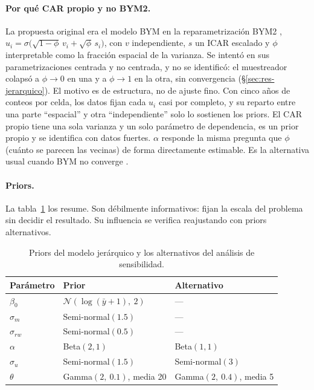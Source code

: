 \paragraph{Por qué CAR propio y no BYM2.} La propuesta original era el modelo
BYM \parencite{besag1991bayesian} en la reparametrización BYM2
\parencite{riebler2016intuitive},
$u_i = \sigma\big(\sqrt{1-\phi}\, v_i + \sqrt{\phi}\, s_i\big)$, con $v$
independiente, $s$ un ICAR escalado y $\phi$ interpretable como la fracción
espacial de la varianza. Se intentó en sus parametrizaciones centrada y no
centrada, y no se identificó: el muestreador colapsó a $\phi \to 0$ en una y a
$\phi \to 1$ en la otra, sin convergencia (§\ref{sec:res-jerarquico}). El
motivo es de estructura, no de ajuste fino. Con cinco años de conteos por
celda, los datos fijan cada $u_i$ casi por completo, y su reparto entre una
parte ``espacial'' y otra ``independiente'' solo lo sostienen los priors. El
CAR propio tiene una sola varianza y un solo parámetro de dependencia, es un
prior propio y se identifica con datos fuertes. $\alpha$ responde la misma
pregunta que $\phi$ (cuánto se parecen las vecinas) de forma directamente
estimable. Es la alternativa usual cuando BYM no converge
\parencite{banerjee2014hierarchical}.

\paragraph{Priors.} La tabla~\ref{tab:priors} los resume. Son débilmente
informativos: fijan la escala del problema sin decidir el resultado. Su
influencia se verifica reajustando con priors alternativos.

\begin{table}[t]
	\centering\footnotesize
	\caption{Priors del modelo jerárquico y los alternativos del análisis de
		sensibilidad.}
	\label{tab:priors}
	\begin{tabular}{@{}lll@{}}
		\toprule
		Parámetro     & Prior                               & Alternativo                 \\
		\midrule
		$\beta_0$     & $\mathcal{N}(\log(\bar y + 1),\ 2)$ & ---                         \\
		$\sigma_m$    & Semi-normal$(1.5)$                & ---                         \\
		$\sigma_{rw}$ & Semi-normal$(0.5)$                & ---                         \\
		$\alpha$      & Beta$(2, 1)$                        & Beta$(1, 1)$                \\
		$\sigma_u$    & Semi-normal$(1.5)$                & Semi-normal$(3)$            \\
		$\theta$      & Gamma$(2,\ 0.1)$, media 20        & Gamma$(2,\ 0.4)$, media 5 \\
		\bottomrule
	\end{tabular}
\end{table}

